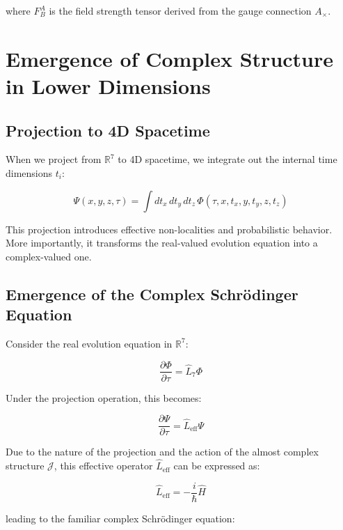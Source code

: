 \documentclass{article}
\begin{document}
where $F^A_B$ is the field strength tensor derived from the gauge connection $A_\times$.

\section{Emergence of Complex Structure in Lower Dimensions}

\subsection{Projection to 4D Spacetime}

When we project from $\mathbb{R}^7$ to 4D spacetime, we integrate out the internal time dimensions $t_i$:

\begin{equation}
\Psi(x,y,z,\tau) = \int dt_x \, dt_y \, dt_z \, \Phi(\tau, x, t_x, y, t_y, z, t_z)
\end{equation}

This projection introduces effective non-localities and probabilistic behavior. More importantly, it transforms the real-valued evolution equation into a complex-valued one.

\subsection{Emergence of the Complex Schrödinger Equation}

Consider the real evolution equation in $\mathbb{R}^7$:

\begin{equation}
\frac{\partial \Phi}{\partial \tau} = \hat{L}_7 \Phi
\end{equation}

Under the projection operation, this becomes:

\begin{equation}
\frac{\partial \Psi}{\partial \tau} = \hat{L}_{\text{eff}} \Psi
\end{equation}

Due to the nature of the projection and the action of the almost complex structure $\mathcal{J}$, this effective operator $\hat{L}_{\text{eff}}$ can be expressed as:

\begin{equation}
\hat{L}_{\text{eff}} = -\frac{i}{\hbar} \hat{H}
\end{equation}

leading to the familiar complex Schrödinger equation:
\end{document}
